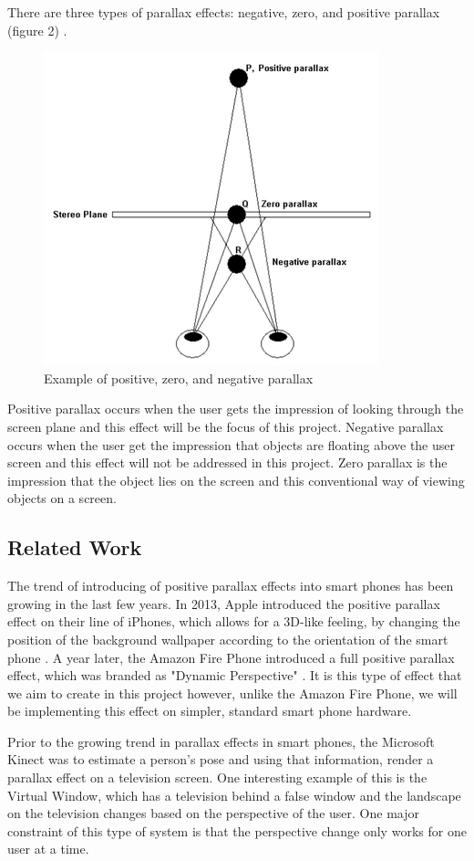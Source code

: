 \documentclass[12pt,twocolumn,letterpaper]{article}
\begin{document}
There are three types of parallax effects: negative, zero, and positive parallax (figure 2) \cite{CSU}.  

\begin{figure}[!htbp]
\centering
\includegraphics[height=35 mm]{NegPosParallax.png}
\caption{Example of positive, zero, and negative parallax}
\end{figure}

Positive parallax occurs when the user gets the impression of looking through the screen plane and this effect will be the focus of this project.  Negative parallax occurs when the user get the impression that objects are floating above the user screen and this effect will not be addressed in this project.  Zero parallax is the impression that the object lies on the screen and this conventional way of viewing objects on a screen.

\subsection{Related Work}
The trend of introducing of positive parallax effects into smart phones has been growing in the last few years.  In 2013, Apple introduced the positive parallax effect on their line of iPhones, which allows for a 3D-like feeling, by changing the position of the background wallpaper according to the orientation of the smart phone \cite{BusinessInsider}.  A year later, the Amazon Fire Phone introduced a full positive parallax effect, which was branded as "Dynamic Perspective" \cite{DigitalTrends}.  It is this type of effect that we aim to create in this project however, unlike the Amazon Fire Phone, we will be implementing this effect on simpler, standard smart phone hardware.

Prior to the growing trend in parallax effects in smart phones, the Microsoft Kinect was to estimate a person's pose and using that information, render a parallax effect on a television screen.  One interesting example of this is the Virtual Window, which has a television behind a false window and the landscape on the television changes based on the perspective of the user.  One major constraint of this type of system is that the perspective change only works for one user at a time.
\end{document}
